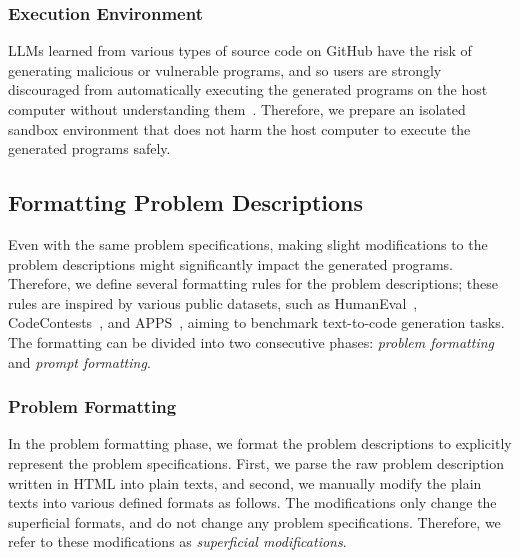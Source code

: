 \documentclass{article}
\begin{document}
\subsubsection{Execution Environment}
\label{sec:experiments:evaluation:environment}

LLMs learned from various types of source code on GitHub have the risk of generating malicious or vulnerable programs, and so users are strongly discouraged from automatically executing the generated programs on the host computer without understanding them~\citep{chen2021codex, pearce2021security}.
Therefore, we prepare an isolated sandbox environment that does not harm the host computer to execute the generated programs safely.







\subsection{Formatting Problem Descriptions}
\label{sec:experiments:formatting}

Even with the same problem specifications, making slight modifications to the problem descriptions might significantly impact the generated programs.
Therefore, we define several formatting rules for the problem descriptions; these rules are inspired by various public datasets, such as HumanEval~\citep{chen2021codex}, CodeContests~\citep{li2022alphacode}, and APPS~\citep{hendrycks2021apps}, aiming to benchmark text-to-code generation tasks.
The formatting can be divided into two consecutive phases: \textit{problem formatting} and \textit{prompt formatting}.







\subsubsection{Problem Formatting}
\label{sec:experiments:formatting:problem}

In the problem formatting phase, we format the problem descriptions to explicitly represent the problem specifications.
First, we parse the raw problem description written in HTML into plain texts, and second, we manually modify the plain texts into various defined formats as follows.
The modifications only change the superficial formats, and do not change any problem specifications.
Therefore, we refer to these modifications as \textit{superficial modifications}.
\end{document}
